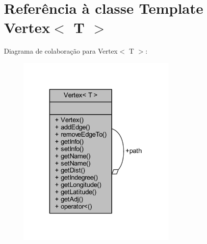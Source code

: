 \hypertarget{class_vertex}{}\section{Referência à classe Template Vertex$<$ T $>$}
\label{class_vertex}


Diagrama de colaboração para Vertex$<$ T $>$\+:
\nopagebreak
\begin{figure}[H]
\begin{center}
\leavevmode
\includegraphics[width=221pt]{class_vertex__coll__graph}
\end{center}
\end{figure}
